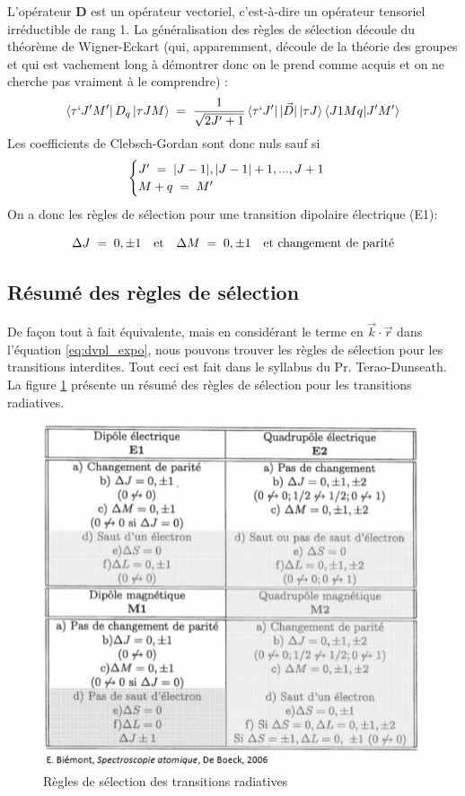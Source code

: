 L'opérateur $\bm{D}$ est un opérateur vectoriel, c'est-à-dire un opérateur tensoriel irréductible de rang 1. La généralisation des règles de sélection découle du théorème de Wigner-Eckart (qui, apparemment, découle de la théorie des groupes et qui est vachement long à démontrer donc on le prend comme acquis et on ne cherche pas vraiment à le comprendre) :
\begin{equation}
    \bra{\tau ` J'M'}D_q\ket{\tau JM}\; = \; \dfrac{1}{\sqrt{2J'+1}}\bra{\tau `J'}|\vec{D}|\ket{\tau J}\bra{J1Mq}\ket{J'M'}
\end{equation}
Les coefficients de Clebsch-Gordan sont donc nuls sauf si
\[
\begin{cases}
    J'\; = \; |J-1|, |J-1|+1, ..., J+1 \\
    M+q\; = \; M'
\end{cases}
\]
On a donc les règles de sélection pour une transition dipolaire électrique (E1):

\begin{equation}
    \Delta J\; = \; 0, \pm1 \quad \text{et} \quad \Delta M\; = \; 0, \pm 1 \quad \text{et        changement de parité}
\end{equation}



\subsection{Résumé des règles de sélection}
De façon tout à fait équivalente, mais en considérant le terme en $\vec{k}\cdot\vec{r}$ dans l'équation \eqref{eq:dvpl_expo}, nous pouvons trouver les règles de sélection pour les transitions interdites. Tout ceci est fait dans le syllabus du Pr. Terao-Dunseath. La figure \ref{fig:regles_transision_radiatives} présente un résumé des règles de sélection pour les transitions radiatives.


\begin{figure}[ht]
    \centering
    \includegraphics[scale=0.8]{Images2/regles.PNG}
    \caption{Règles de sélection des transitions radiatives}
    \label{fig:regles_transision_radiatives}
\end{figure}

